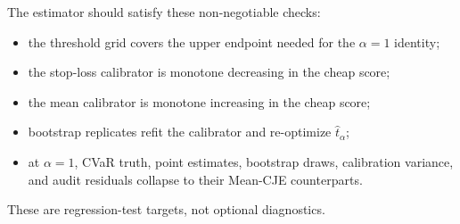 The estimator should satisfy these non-negotiable checks:
\begin{itemize}[leftmargin=*,nosep]
\item the threshold grid covers the upper endpoint needed for the
$\alpha=1$ identity;
\item the stop-loss calibrator is monotone decreasing in the cheap score;
\item the mean calibrator is monotone increasing in the cheap score;
\item bootstrap replicates refit the calibrator and re-optimize
$\hat t_\alpha$;
\item at $\alpha=1$, CVaR truth, point estimates, bootstrap draws,
calibration variance, and audit residuals collapse to their Mean-CJE
counterparts.
\end{itemize}
These are regression-test targets, not optional diagnostics.
